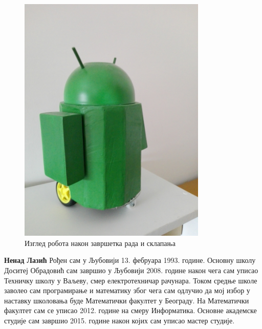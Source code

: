 \documentclass[12pt,oneside]{memoir}
\theoremstyle{remark}
\begin{document}
\begin{figure}[!ht]
\centering
\includegraphics[width=0.80\textwidth]{slike/final.jpg}
\caption{Изглед робота након завршетка рада и склапања}
\label{fig:finalrobot}
\end{figure}

\literatura




\backmatter

\begin{biografija}
\textbf{Ненад Лазић} 
Рођен сам у Љубовији 13. фебруара 1993. године. Основну школу Доситеј Обрадовић сам завршио у Љубовији 2008. године 
након чега сам уписао Техничку школу у Ваљеву, смер електротехничар рачунара. Током средње школе заволео сам програмирање
и математику због чега сам одлучио да мој избор у наставку школовања буде Математички факултет у Београду. На Математички факултет
сам се уписао 2012. године на смеру Информатика. Основне академске студије сам завршио 2015. године након којих сам уписао мастер студије.

\end{biografija}
\end{document}

